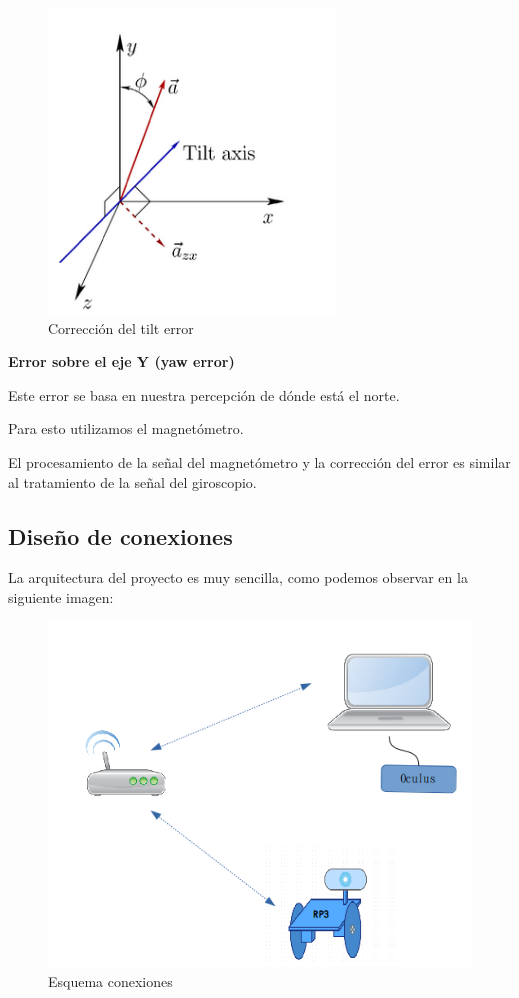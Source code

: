 \documentclass[twoside, 12pt]{epstfg}
\begin{document}
\begin{figure}[h]
	\centerline{
		\mbox{\includegraphics[width=3.00in]{images/ejestracking.png}}
	}
	\caption{Corrección del tilt error}
\end{figure}


\newpage
\textbf{Error sobre el eje Y (yaw error)}

Este error se basa en nuestra percepción de dónde está el norte.

Para esto utilizamos el magnetómetro.

El procesamiento de la señal del magnetómetro y la corrección del error es similar al tratamiento de la señal del giroscopio.

\subsection{Diseño de conexiones}

La arquitectura del proyecto es muy sencilla, como podemos observar en la siguiente imagen:

\begin{figure}[h]
	\centerline{
		\mbox{\includegraphics[width=.80\textwidth]{images/EsquemaConexiones.png}}
	}
	\caption{Esquema conexiones}
\end{figure}
\end{document}
